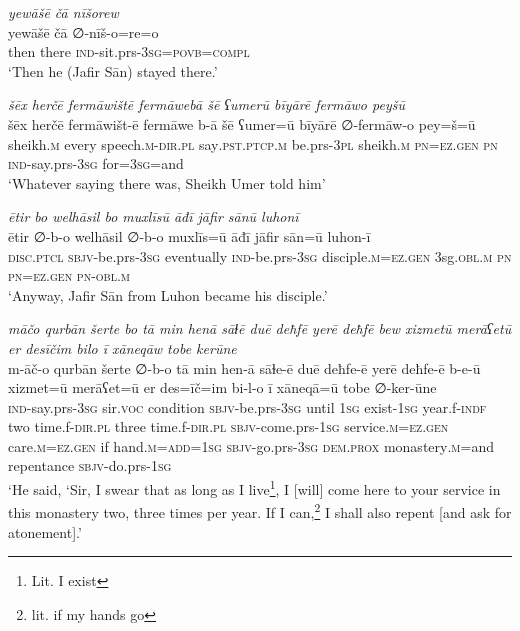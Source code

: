 \ea \label{ŠJ.93}
\textit{yewāšē čā nīšorew} \\ 
\gll yewāšē čā ∅-nīš-o=re=o \\ 
 then there \textsc{ind-}sit.prs\textsc{-3sg}\textsc{=\textsc{povb}}\textsc{=compl} \\ 
\glt `Then he (Jafir Sān) stayed there.'
\z 
 
\ea \label{ŠJ.94}
\textit{šēx herčē fermāwištē fermāwebā šē ʕumerū bīyārē fermāwo peyšū} \\ 
\gll šēx herčē fermāwišt-ē fermāwe b-ā šē ʕumer=ū bīyārē ∅-fermāw-o pey=š=ū \\ 
 sheikh\textsc{.m} every speech\textsc{.m}\textsc{-dir}\textsc{.pl} say\textsc{.pst}\textsc{.ptcp}\textsc{.m} be.prs\textsc{-3pl} sheikh\textsc{.m} \textsc{pn}\textsc{=ez.gen} \textsc{pn} \textsc{ind-}say.prs\textsc{-3sg} for\textsc{=3sg}=and \\ 
\glt `Whatever saying there was, Sheikh Umer told him'
\z 
 
\ea \label{ŠJ.97}
\textit{ētir bo welhāsil bo muxlīsū āđī jāfir sānū luhonī} \\ 
\gll ētir ∅-b-o welhāsil ∅-b-o muxlīs=ū āđī jāfir sān=ū luhon-ī \\ 
 \textsc{disc.ptcl} \textsc{sbjv-}be.prs\textsc{-3sg} eventually \textsc{ind-}be.prs\textsc{-3sg} disciple\textsc{.m}\textsc{=ez.gen} 3sg\textsc{.obl}\textsc{.m} \textsc{pn} \textsc{pn}\textsc{=ez.gen} \textsc{pn}\textsc{-obl}\textsc{.m} \\ 
\glt `Anyway, Jafir Sān from Luhon became his disciple.'
\z 
 
\ea \label{ŠJ.98}
\textit{māčo qurbān šerte bo tā min henā sāɫē duē deħfē yerē deħfē bew xizmetū merāʕetū er desīčim bilo ī xāneqāw tobe kerūne} \\ 
\gll m-āč-o qurbān šerte ∅-b-o tā min hen-ā sāɫe-ē duē deħfe-ē yerē deħfe-ē b-e-ū xizmet=ū merāʕet=ū er des=īč=im bi-l-o ī xāneqā=ū tobe ∅-ker-ūne \\ 
 \textsc{ind-}say.prs\textsc{-3sg} sir.\textsc{voc} condition \textsc{sbjv-}be.prs\textsc{-3sg} until \textsc{1sg} exist\textsc{-\textsc{1sg}} year.f\textsc{-indf} two time.f\textsc{-dir}\textsc{.pl} three time.f\textsc{-dir}\textsc{.pl} \textsc{sbjv-}come.prs\textsc{-\textsc{1sg}} service\textsc{.m}\textsc{=ez.gen} care\textsc{.m}\textsc{=ez.gen} if hand\textsc{.m}\textsc{=add}\textsc{=\textsc{1sg}} \textsc{sbjv-}go.prs\textsc{-3sg} \textsc{dem.prox} monastery\textsc{.m}=and repentance \textsc{sbjv-}do.prs\textsc{-\textsc{1sg}} \\ 
\glt `He said, ‘Sir, I swear that as long as I live\footnote{Lit. I exist}, I [will] come here to your service in this monastery two, three times per year. If I can,\footnote{lit. if my hands go} I shall also repent [and ask for atonement].'
\z 
 
